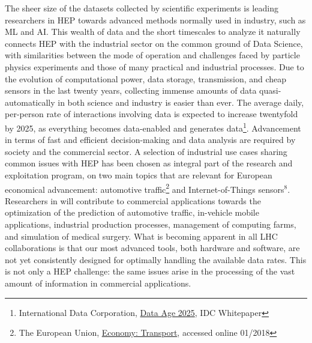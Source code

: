 The sheer size of the datasets collected by scientific experiments is leading researchers in HEP towards advanced methods normally used in industry, such as ML and AI. 
This wealth of data and the short timescales to analyze it naturally connects HEP with the industrial sector on the common ground of Data Science, with similarities between the mode of operation and challenges faced by particle physics experiments and those of many practical and industrial processes. 
Due to the evolution of computational power, data storage, transmission, and cheap sensors in the last twenty years, collecting immense amounts of data quasi-automatically in both science and industry is easier than ever. 
The average daily, per-person rate of interactions involving data is expected to increase twentyfold by 2025, as everything becomes data-enabled and generates data\footnote{International Data Corporation, \href{https://www.seagate.com/files/www-content/our-story/trends/files/Seagate-WP-DataAge2025-March-2017.pdf}{Data Age 2025}, IDC Whitepaper}.
Advancement in terms of fast and efficient decision-making and data analysis are required by society and the commercial sector. A selection of industrial use cases sharing common issues with HEP has been chosen as integral part of the \acronym research and exploitation program, on two main topics that are
relevant for European economical advancement: automotive traffic\footnote{The European Union, \href{https://europa.eu/european-union/about-eu/figures/economy_en}{Economy: Transport}, accessed online 01/2018} and Internet-of-Things sensors$^8$. 
Researchers in \acronym will contribute to commercial applications towards the optimization of the prediction of automotive traffic, in-vehicle mobile applications, industrial production processes, management of computing farms, and simulation of medical surgery. 
\vskip2pt
What is becoming apparent in all LHC collaborations is that our most advanced tools, both hardware and software, are not yet consistently designed for optimally handling the available data rates. 
This is not only a HEP challenge: the same issues arise in the processing of the vast amount of information in commercial applications. 
